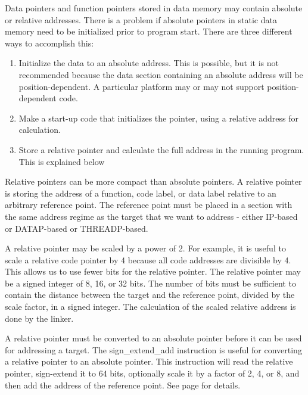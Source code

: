 \documentclass[forwardcom.tex]{subfiles}
\begin{document}
Data pointers and function pointers stored in data memory may contain absolute or relative addresses. 
There is a problem if absolute pointers in static data memory need to be initialized prior to program start. There are three different ways to accomplish this:
\begin{enumerate}
  \item Initialize the data to an absolute address. This is possible, but it is not recommended because the data section containing an absolute address will be position-dependent. A particular platform may or may not support position-dependent code.
  
  \item Make a start-up code that initializes the pointer, using a relative address for calculation.
        
  \item Store a relative pointer and calculate the full address in the running
        program. This is explained below
  
\end{enumerate}
\vspace{4mm}


Relative pointers can be more compact than absolute pointers. 
A relative pointer is storing the address of a function, code label, or data label relative to an arbitrary reference point. The reference point must be placed in a section with the same address regime as the target that we want to address - either IP-based or DATAP-based or THREADP-based.
\vv

A relative pointer may be scaled by a power of 2. For example, it is useful to scale a relative code pointer by 4 because all code addresses are divisible by 4. This allows us to use fewer bits for the relative pointer. The relative pointer may be a signed integer of 8, 16, or 32 bits. The number of bits must be sufficient to contain the distance between the target and the reference point, divided by the scale factor, in a signed integer. The calculation of the scaled relative address is done by the linker.
\vv

A relative pointer must be converted to an absolute pointer before it can be used for addressing a target. The sign\_extend\_add instruction is useful for converting a relative pointer to an absolute pointer. This instruction will read the relative pointer, sign-extend it to 64 bits, optionally scale it by a factor of 2, 4, or 8, and then add the address of the reference point. 
See page \pageref{relativeDataPointer} for details.
\vv
\end{document}

